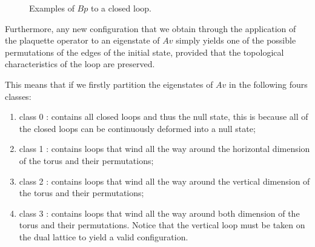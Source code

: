 \documentclass{Configuration_Files/PoliMi3i_thesis}
\begin{document}
\begin{figure}
\begin{center}

	\end{center}

\caption{Examples of $Bp$ to a closed loop.}
\label{fig:applyBp}
\end{figure}


Furthermore, any new configuration that we obtain through the application of the plaquette operator to an eigenstate of $Av$ simply yields one of the possible permutations of the edges of the initial state, provided that the topological characteristics of the loop are preserved.

This means that if we firstly partition the eigenstates of $Av$ in the following fours classes: 

\begin{enumerate}
	\item class 0 : contains all closed loops and thus the null state,
	this is because all of the closed loops can be continuously deformed into a null state;
	
	\item class 1 : contains loops that wind all the way around the horizontal dimension of the torus and their permutations;
	
	\item class 2 : contains loops that wind all the way around the vertical dimension of the torus and their permutations;
	
	\item class 3 : contains loops that wind all the way around both dimension of the torus and their permutations. Notice that the vertical loop must be taken on the dual lattice to yield a valid configuration.
	
\end{enumerate}
\end{document}
